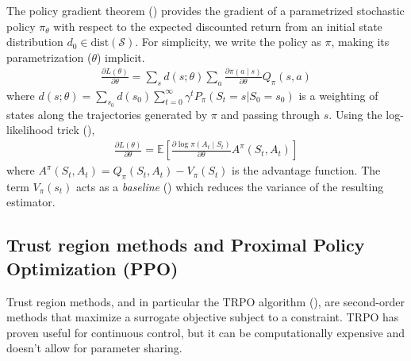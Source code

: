 \documentclass{article}
\def\given{\middle\vert}
\def\expectation{\mathbb{E}}
\newcommand{\deriv}[2][]{\frac{\partial#1}{\partial#2}}
\def\states{\mathscr{S}}
\begin{document}
The policy gradient theorem (\cite{Sutton1999}) provides the gradient of a parametrized stochastic policy $\pi_\theta$ with respect to the expected discounted return from an initial state distribution $d_0 \in \text{dist}(\states)$. For simplicity, we write the policy as $\pi$, making its parametrization ($\theta$) implicit.
\begin{align*}
    \deriv[L(\theta)]{\theta} = \sum_{s} d(s;\theta) \sum_{a} \deriv[\pi\left(a \given s\right)]{\theta}Q_{\pi}(s, a)
\end{align*} 
where  $d(s;\theta) = \sum_{s_0} d(s_0) \sum_{t=0}^{\infty} \gamma^t P_{\pi}(S_t = s | S_0 = s_0)$
is a weighting of states along the trajectories generated by $\pi$ and passing through $s$. 
Using the log-likelihood trick (\cite{Williams1992}),
\begin{align*}
    \deriv[L(\theta)]{\theta} = \expectation\left[ \deriv[\log \pi\left(A_t \given S_t\right)]{\theta} A^{\pi}(S_t, A_t)  \right]
\end{align*}
where $A^{\pi}(S_t, A_t) = Q_{\pi}(S_t, A_t) - V_{\pi}(S_t)$ is the advantage function. The term $V_{\pi}(s_t)$ acts as a \textit{baseline} (\cite{Williams1992,Sutton1999}) which reduces the variance of the resulting
estimator. 
\vspace*{-8pt}

\subsection{Trust region methods and Proximal Policy Optimization (PPO)}
\vspace*{-8pt}

Trust region methods, and in particular the TRPO algorithm (\cite{SchulmanLMJA15}), are second-order methods that maximize a surrogate objective subject to a constraint.
TRPO has proven useful for continuous control, but it can be computationally expensive and doesn't allow for parameter sharing.
\end{document}
